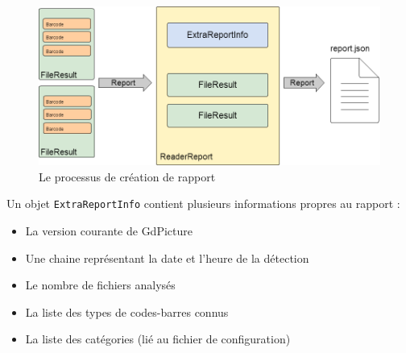 \begin{figure}
\begin{center}
\includegraphics[scale=0.5]{images/projet1Rapport.png}
\end{center}
\caption{Le processus de création de rapport}
\end{figure}

Un objet \verb|ExtraReportInfo| contient plusieurs informations propres au rapport :
\begin{itemize}
\item La version courante de GdPicture
\item Une chaine représentant la date et l'heure de la détection
\item Le nombre de fichiers analysés
\item La liste des types de codes-barres connus
\item La liste des catégories (lié au fichier de configuration)
\end{itemize}